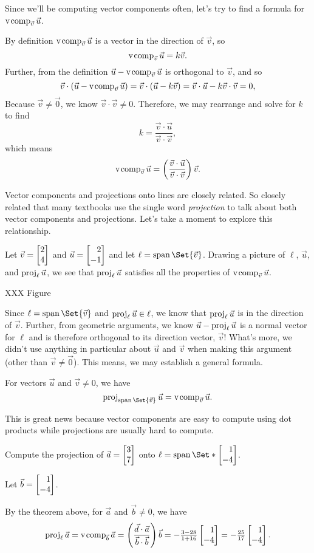 Since we'll be computing vector components often, let's try to find a formula for $\operatorname{v\hspace{1pt}comp}_{\vec v}\vec u$.

By definition $\operatorname{v\hspace{1pt}comp}_{\vec v}\vec u$ is a vector in the direction of $\vec v$, so
\[
	\operatorname{v\hspace{1pt}comp}_{\vec v}\vec u = k\vec v.
\]
Further, from the definition $\vec u-\operatorname{v\hspace{1pt}comp}_{\vec v}\vec u$ is orthogonal to $\vec v$, and so
\[
	\vec v\cdot (\vec u-\operatorname{v\hspace{1pt}comp}_{\vec v}\vec u) = \vec v\cdot (\vec u-k\vec v)=\vec v\cdot \vec u-k\vec v\cdot \vec v=0,
\]
Because $\vec v\neq \vec 0$, we know $\vec v\cdot \vec v\neq 0$. Therefore, we may rearrange and solve for $k$ to find
\[
	k=\frac{\vec v\cdot \vec u}{\vec v\cdot \vec v},
\]
which means
\[
	\operatorname{v\hspace{1pt}comp}_{\vec v}\vec u = \left(\frac{\vec v\cdot \vec u}{\vec v\cdot \vec v}\right)\vec v.
\]


Vector components and projections onto lines are closely related. So closely related that many textbooks
use the single word \emph{projection} to talk about both vector components and projections. Let's take a moment
to explore this relationship.

Let $\vec v=\mat{2\\4}$ and $\vec u=\mat{2\\-1}$ and let $\ell=\Span\Set{\vec v}$. Drawing a picture of
$\ell$, $\vec u$, and $\operatorname{proj}_\ell\vec u$, we see that $\operatorname{proj}_\ell\vec u$ satisfies all the properties
of $\operatorname{v\hspace{1pt}comp}_{\vec v}\vec u$.

XXX Figure

Since $\ell=\Span\Set{\vec v}$ and $\operatorname{proj}_\ell\vec u\in\ell$, we know that $\operatorname{proj}_\ell\vec u$ is in the direction
of $\vec v$. Further, from geometric arguments, we know $\vec u-\operatorname{proj}_\ell\vec u$ is a normal vector for $\ell$
and is therefore orthogonal to its direction vector, $\vec v$! What's more, we didn't
use anything in particular about $\vec u$ and $\vec v$ when making this argument (other than $\vec v\neq \vec 0$). This means,
we may establish a general formula. 

\begin{theorem}
	For vectors $\vec u$ and $\vec v\neq 0$, we have
	\[
		\Proj_{\Span\Set{\vec v}}\vec u=\Vcomp_{\vec v}\vec u.
	\]
\end{theorem}

This is great news because vector components are easy to compute using dot products while projections are usually hard to compute.

\begin{example}
	Compute the projection of $\vec a=\mat{3\\7}$ onto $\ell=\Span\Set*{\mat{1\\-4}}$.

	Let $\vec b = \mat{1\\-4}$. 
	
	By the theorem above, for $\vec a$ and $\vec b\neq 0$, we have
	\[
	    \Proj_\ell \vec a = \Vcomp_{\vec b} \vec a = \left(\frac{\vec d\cdot \vec a}{\vec b\cdot \vec b}\right)\vec b = -\tfrac{3-28}{1+16}\mat{1\\-4}=-\tfrac{25}{17}\mat{1\\-4}.
	\]
\end{example}

